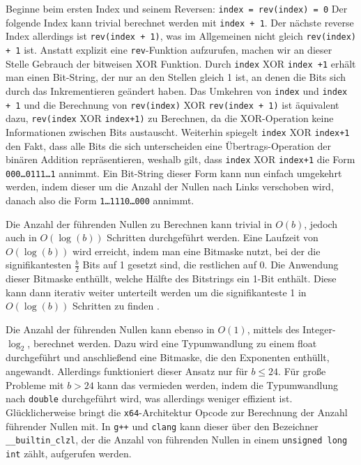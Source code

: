 \documentclass[10pt]{article}
\begin{document}
Beginne beim ersten Index und seinem Reversen: {\tt index = rev(index) = 0}
Der folgende Index kann trivial berechnet werden mit {\tt index + 1}. Der nächste 
reverse Index allerdings ist {\tt rev(index + 1)}, was im Allgemeinen nicht gleich 
{\tt rev(index) + 1} ist. Anstatt explizit eine {\tt rev}-Funktion aufzurufen, machen wir an dieser Stelle Gebrauch 
der bitweisen XOR Funktion. Durch {\tt index} XOR {\tt index +1} erhält man einen Bit-String, der nur an den Stellen 
gleich 1 ist, an denen die Bits sich durch das Inkrementieren geändert haben.
Das Umkehren von {\tt index} und {\tt index + 1} und die Berechnung von {\tt rev(index)} XOR {\tt rev(index + 1)}
ist äquivalent dazu, {\tt rev(}{\tt index} XOR {\tt index+1)} zu Berechnen, da die XOR-Operation keine Informationen
zwischen Bits austauscht. Weiterhin spiegelt {\tt index} XOR {\tt index+1} den Fakt, dass alle Bits die sich unterscheiden
eine Übertrags-Operation der binären Addition repräsentieren, weshalb gilt, dass 
{\tt index} XOR {\tt index+1} die Form {\tt 000\ldots 0111\ldots 1} annimmt. Ein Bit-String dieser Form kann nun einfach 
umgekehrt werden, indem dieser um die Anzahl der Nullen nach Links verschoben wird, danach also die Form {\tt 1\ldots 1110\ldots 000}
annimmt. 

Die Anzahl der führenden Nullen zu Berechnen kann trivial in $O(b)$, jedoch auch in $O(\log(b))$ Schritten durchgeführt werden. 
Eine Laufzeit von $O(\log(b))$ wird erreicht, indem man eine Bitmaske nutzt, bei der die signifikantesten $\frac{b}{2}$ Bits
auf 1 gesetzt sind, die restlichen auf 0. Die Anwendung dieser Bitmaske enthüllt, welche Hälfte des Bitstrings ein 1-Bit enthält.
Diese kann dann iterativ weiter unterteilt werden um die signifikanteste 1 in $O(\log(b))$ Schritten zu finden \cite{anderson:bit}.

Die Anzahl der führenden Nullen kann ebenso in $O(1)$, mittels des Integer-$\log_2$, 
berechnet werden. Dazu wird eine Typumwandlung zu einem float durchgeführt und 
anschließend eine Bitmaske, die den Exponenten enthüllt, angewandt.
Allerdings funktioniert dieser Ansatz nur für $b \leq 24$\cite{anderson:bit}. 
Für große Probleme mit $b > 24$ kann das vermieden werden, indem die Typumwandlung 
nach {\tt double} durchgeführt wird, was allerdings weniger effizient ist.
Glücklicherweise bringt die {\tt x64}-Architektur Opcode zur Berechnung der Anzahl führender Nullen mit.
In {\tt g++} und {\tt clang} kann dieser über den Bezeichner {\tt \_\_builtin\_clzl},
der die Anzahl von führenden Nullen in einem {\tt unsigned long int} zählt, aufgerufen werden. 
\end{document}
